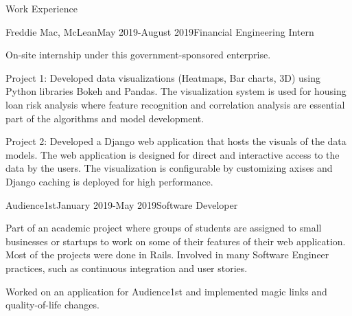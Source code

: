 \documentclass{resume} %
\begin{document}

\begin{rSection}{Work Experience}

\begin{rSubsection}{Freddie Mac, McLean}{May 2019-August 2019}{Financial Engineering Intern}{} 
    \item On-site internship under this government-sponsored enterprise.
    \item Project 1: Developed data visualizations (Heatmaps, Bar charts, 3D) using Python libraries Bokeh and Pandas. The visualization system is used for housing loan risk analysis where feature recognition and correlation analysis are essential part of the algorithms and model development.
    \item Project 2: Developed a Django web application that hosts the visuals of the data models. The web application is designed for direct and interactive access to the data by the users. The visualization is configurable by customizing axises and Django caching is deployed for high performance.
\end{rSubsection}

\begin{rSubsection}{Audience1st}{January 2019-May 2019}{Software Developer}{}
    \item Part of an academic project where groups of students are assigned to small businesses or startups to work on some of their features of their web application. Most of the projects were done in Rails. Involved in many Software Engineer practices, such as continuous integration and user stories.
    \item Worked on an application for Audience1st and implemented magic links and quality-of-life changes.
\end{rSubsection}

\end{rSection}
\end{document}
